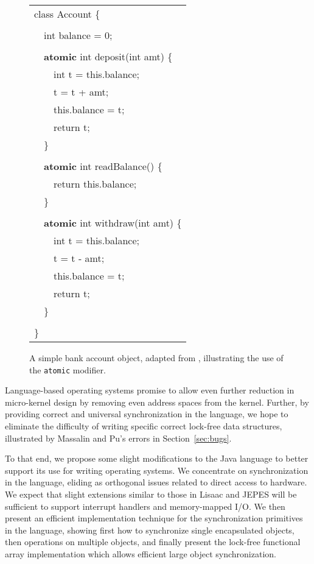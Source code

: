 \documentclass[preprint]{rdbacmconf}
\newcommand{\atomic}{\texttt{atomic}\xspace}
\begin{document}
\begin{figure}[t]
{\ttfamily\small\vspace{.25in}
\begin{tabular}{l}
class Account \{\\
\\
~~int balance = 0;\\
\\
~~{\bf atomic} int deposit(int amt) \{\\
~~~~int t = this.balance;\\
~~~~t = t + amt;\\
~~~~this.balance = t;\\
~~~~return t;\\
~~\}\\
\\
~~{\bf atomic} int readBalance() \{\\
~~~~return this.balance;\\
~~\}\\
\\
~~{\bf atomic} int withdraw(int amt) \{\\
~~~~int t = this.balance;\\
~~~~t = t - amt;\\
~~~~this.balance = t;\\
~~~~return t;\\
~~\}\\
\\
\}\\
\end{tabular}
}\vspace{.2in}
\caption{A simple bank account object, adapted from \cite{FlanaganQa03},
  illustrating the use of the \atomic modifier.}
\label{fig:atomic}
\end{figure}
Language-based operating systems promise to allow even further
reduction in micro-kernel design by removing even address spaces from the
kernel.  Further, by providing correct and universal synchronization
in the language, we hope to eliminate the difficulty of writing
specific correct lock-free data structures, illustrated by Massalin
and Pu's errors in Section~\ref{sec:bugs}.

To that end, we propose some slight modifications to the Java
language to better support its use for writing operating systems.
We concentrate on synchronization in the language, eliding as
orthogonal issues related to direct access to hardware.  We expect
that slight extensions similar to those in Lisaac \cite{SonntagCo02} and
JEPES \cite{SchultzBuChKn03} will be sufficient to support interrupt handlers
and memory-mapped I/O.  We then present an efficient implementation
technique for the synchronization primitives in the language, showing
first how to synchronize single encapsulated objects, then operations
on multiple objects, and finally present the lock-free functional
array implementation which allows efficient large object
synchronization.
\end{document}
